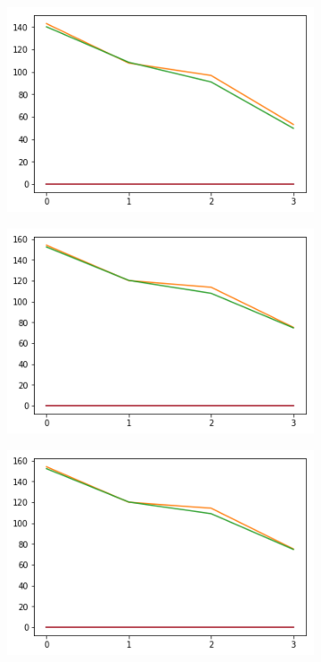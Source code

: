 \begin{figure}[h!]
  \begin{subfigure}[b]{0.3\linewidth}
    \includegraphics[width=\linewidth]{images/compl/ef0_means_pos.png}
    \caption{}
  \end{subfigure}
  \begin{subfigure}[b]{0.3\linewidth}
    \includegraphics[width=\linewidth]{images/compl/ef1_means_pos.png}
    \caption{}
  \end{subfigure}
  \begin{subfigure}[b]{0.3\linewidth}
    \includegraphics[width=\linewidth]{images/compl/ef2_means_pos.png}
    \caption{}
  \end{subfigure}
    

\end{figure}
